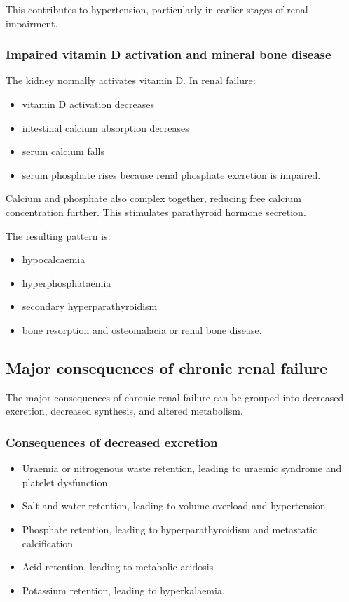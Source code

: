 \documentclass[11pt,a4paper]{article}
\begin{document}
This contributes to hypertension, particularly in earlier stages of renal impairment.\cite{KamPowerRenalFailure}

\subsubsection{Impaired vitamin D activation and mineral bone disease}

The kidney normally activates vitamin D. In renal failure:
\begin{itemize}
  \item vitamin D activation decreases
  \item intestinal calcium absorption decreases
  \item serum calcium falls
  \item serum phosphate rises because renal phosphate excretion is impaired.
\end{itemize}

Calcium and phosphate also complex together, reducing free calcium concentration further. This stimulates parathyroid hormone secretion.

The resulting pattern is:
\begin{itemize}
  \item hypocalcaemia
  \item hyperphosphataemia
  \item secondary hyperparathyroidism
  \item bone resorption and osteomalacia or renal bone disease.
\end{itemize}

\subsection{Major consequences of chronic renal failure}

The major consequences of chronic renal failure can be grouped into decreased excretion, decreased synthesis, and altered metabolism.

\subsubsection{Consequences of decreased excretion}

\begin{itemize}
  \item Uraemia or nitrogenous waste retention, leading to uraemic syndrome and platelet dysfunction
  \item Salt and water retention, leading to volume overload and hypertension
  \item Phosphate retention, leading to hyperparathyroidism and metastatic calcification
  \item Acid retention, leading to metabolic acidosis
  \item Potassium retention, leading to hyperkalaemia.
\end{itemize}
\end{document}
